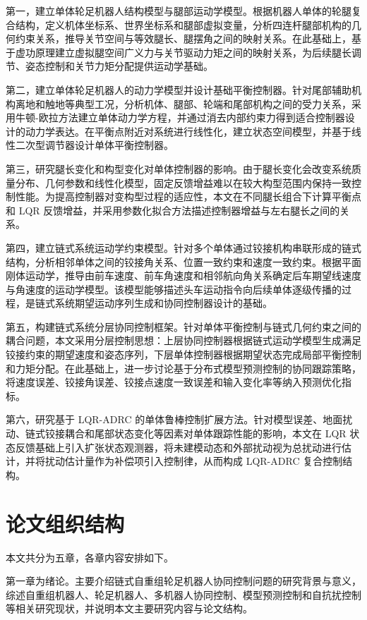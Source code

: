 \documentclass[type=bachelor]{bithesis}
\begin{document}
第一，建立单体轮足机器人结构模型与腿部运动学模型。根据机器人单体的轮腿复合结构，定义机体坐标系、世界坐标系和腿部虚拟变量，分析四连杆腿部机构的几何约束关系，推导关节空间与等效腿长、腿摆角之间的映射关系。在此基础上，基于虚功原理建立虚拟腿空间广义力与关节驱动力矩之间的映射关系，为后续腿长调节、姿态控制和关节力矩分配提供运动学基础。

第二，建立单体轮足机器人的动力学模型并设计基础平衡控制器。针对尾部辅助机构离地和触地等典型工况，分析机体、腿部、轮端和尾部机构之间的受力关系，采用牛顿-欧拉方法建立单体动力学方程，并通过消去内部约束力得到适合控制器设计的动力学表达。在平衡点附近对系统进行线性化，建立状态空间模型，并基于线性二次型调节器设计单体平衡控制器。

第三，研究腿长变化和构型变化对单体控制器的影响。由于腿长变化会改变系统质量分布、几何参数和线性化模型，固定反馈增益难以在较大构型范围内保持一致控制性能。为提高控制器对变构型过程的适应性，本文在不同腿长组合下计算平衡点和 LQR 反馈增益，并采用参数化拟合方法描述控制器增益与左右腿长之间的关系。

第四，建立链式系统运动学约束模型。针对多个单体通过铰接机构串联形成的链式结构，分析相邻单体之间的铰接角关系、位置一致约束和速度一致约束。根据平面刚体运动学，推导由前车速度、前车角速度和相邻航向角关系确定后车期望线速度与角速度的运动学模型。该模型能够描述头车运动指令向后续单体逐级传播的过程，是链式系统期望运动序列生成和协同控制器设计的基础。

第五，构建链式系统分层协同控制框架。针对单体平衡控制与链式几何约束之间的耦合问题，本文采用分层控制思想：上层协同控制器根据链式运动学模型生成满足铰接约束的期望速度和姿态序列，下层单体控制器根据期望状态完成局部平衡控制和力矩分配。在此基础上，进一步讨论基于分布式模型预测控制的协同跟踪策略，将速度误差、铰接角误差、铰接点速度一致误差和输入变化率等纳入预测优化指标。

第六，研究基于 LQR-ADRC 的单体鲁棒控制扩展方法。针对模型误差、地面扰动、链式铰接耦合和尾部状态变化等因素对单体跟踪性能的影响，本文在 LQR 状态反馈基础上引入扩张状态观测器，将未建模动态和外部扰动视为总扰动进行估计，并将扰动估计量作为补偿项引入控制律，从而构成 LQR-ADRC 复合控制结构。



\section{论文组织结构}
本文共分为五章，各章内容安排如下。

第一章为绪论。主要介绍链式自重组轮足机器人协同控制问题的研究背景与意义，综述自重组机器人、轮足机器人、多机器人协同控制、模型预测控制和自抗扰控制等相关研究现状，并说明本文主要研究内容与论文结构。
\end{document}
